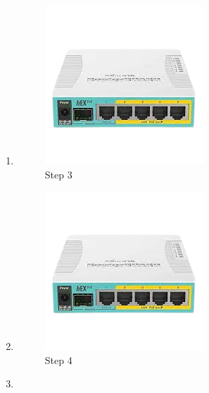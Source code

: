 \begin{enumerate}
	\item 
	
	\begin{figure}[H]
		\centering
		\includegraphics[width=0.7\linewidth]{P1/img/contoh.png}
		\caption{Step 3}
		\label{fig:gambar1}
	\end{figure}

	\item 
	
	\begin{figure}[H]
		\centering
		\includegraphics[width=0.7\linewidth]{P1/img/contoh.png}
		\caption{Step 4}
		\label{fig:gambar1}
	\end{figure}

	\item 
	

\end{enumerate}
